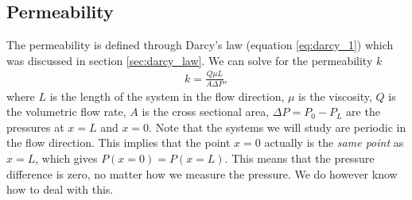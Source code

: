 \subsection{Permeability}
\label{sec:permeability_dsmc}
The permeability is defined through Darcy's law (equation \eqref{eq:darcy_1}) which was discussed in section \ref{sec:darcy_law}. We can solve for the permeability $k$
\begin{align}
	\label{eq:permeability_gas}
	k = \frac{Q \mu L}{A\Delta P},
\end{align}
where $L$ is the length of the system in the flow direction, $\mu$ is the viscosity, $Q$ is the volumetric flow rate, $A$ is the cross sectional area, $\Delta P = P_0 - P_L$ are the pressures at $x=L$ and $x=0$. Note that the systems we will study are periodic in the flow direction. This implies that the point $x=0$ actually is the \textit{same point} as $x=L$, which gives $P(x=0) = P(x=L)$. This means that the pressure difference is zero, no matter how we measure the pressure. We do however know how to deal with this. 